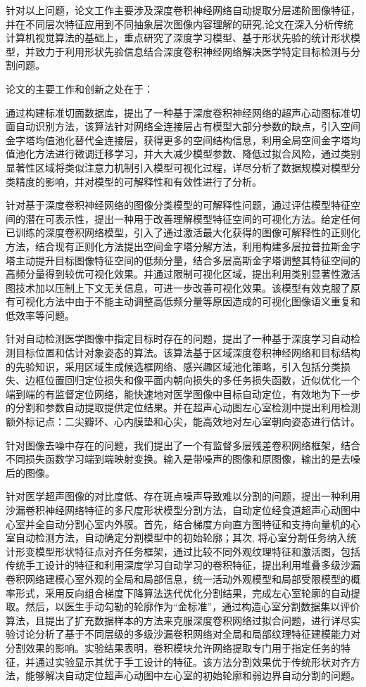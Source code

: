 针对以上问题，论文工作主要涉及深度卷积神经网络自动提取分层递阶图像特征，并在不同层次特征应用到不同抽象层次图像内容理解的研究,论文在深入分析传统计算机视觉算法的基础上，重点研究了深度学习模型、基于形状先验的统计形状模型，并致力于利用形状先验信息结合深度卷积神经网络解决医学特定目标检测与分割问题。

论文的主要工作和创新之处在于：

通过构建标准切面数据库，提出了一种基于深度卷积神经网络的超声心动图标准切面自动识别方法，该算法针对网络全连接层占有模型大部分参数的缺点，引入空间金字塔均值池化替代全连接层，获得更多的空间结构信息，利用全局空间金字塔均值池化方法进行微调迁移学习，并大大减少模型参数、降低过拟合风险，通过类别显著性区域将类似注意力机制引入模型可视化过程，详尽分析了数据规模对模型分类精度的影响，并对模型的可解释性和有效性进行了分析。

针对基于深度卷积神经网络的图像分类模型的可解释性问题，通过评估模型特征空间的潜在可表示性，提出一种用于改善理解模型特征空间的可视化方法。给定任何已训练的深度卷积网络模型，引入了通过激活最大化获得的图像可解释性的正则化方法，结合现有正则化方法提出空间金字塔分解方法，利用构建多层拉普拉斯金字塔主动提升目标图像特征空间的低频分量，结合多层高斯金字塔调整其特征空间的高频分量得到较优可视化效果。并通过限制可视化区域，提出利用类别显著性激活图技术加以压制上下文无关信息，可进一步改善可视化效果。该模型有效克服了原有可视化方法中由于不能主动调整高低频分量等原因造成的可视化图像语义重复和低效率等问题。

针对自动检测医学图像中指定目标时存在的问题，提出了一种基于深度学习自动检测目标位置和估计对象姿态的算法。该算法基于区域深度卷积神经网络和目标结构的先验知识，采用区域生成候选框网络、感兴趣区域池化策略，引入包括分类损失、边框位置回归定位损失和像平面内朝向损失的多任务损失函数，近似优化一个端到端的有监督定位网络，能快速地对医学图像中目标自动定位，有效地为下一步的分割和参数自动提取提供定位结果。并在超声心动图左心室检测中提出利用检测额外标记点：二尖瓣环、心内膜垫和心尖，能高效地对左心室朝向姿态进行估计。

针对图像去噪中存在的问题，我们提出了一个有监督多层残差卷积网络框架，结合不同损失函数学习端到端映射变换。输入是带噪声的图像和原图像，输出的是去噪后的图像。

针对医学超声图像的对比度低、存在斑点噪声导致难以分割的问题，提出一种利用沙漏卷积神经网络特征的多尺度形状模型分割方法，自动定位经食道超声心动图中心室并全自动分割心室内外膜。首先，结合梯度方向直方图特征和支持向量机的心室自动检测方法，自动确定分割模型中的初始轮廓；其次, 将心室分割任务纳入统计形变模型形状特征点对齐任务框架，通过比较不同外观纹理特征和激活图，包括传统手工设计的特征和利用深度学习自动学习的卷积特征，提出利用堆叠多级沙漏卷积网络建模心室外观的全局和局部信息，统一活动外观模型和局部受限模型的概率形式，采用反向组合梯度下降算法迭代优化分割结果，完成左心室轮廓的自动提取。然后，以医生手动勾勒的轮廓作为“金标准”，通过构造心室分割数据集以评价算法，且提出了扩充数据样本的方法来克服深度卷积网络过拟合问题，进行详尽实验讨论分析了基于不同层级的多级沙漏卷积网络对全局和局部纹理特征建模能力对分割效果的影响。实验结果表明，卷积模块允许网络提取专门用于指定任务的特征，并通过实验显示其优于手工设计的特征。该方法分割效果优于传统形状对齐方法，能够解决自动定位超声心动图中左心室的初始轮廓和弱边界自动分割的问题。


